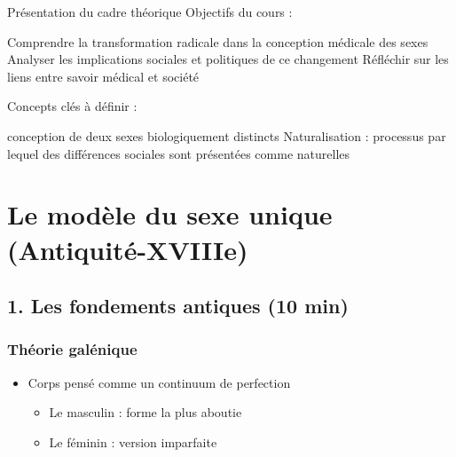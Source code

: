 \documentclass[
  letterpaper,
  DIV=11,
  numbers=noendperiod]{scrreprt}
\providecommand{\tightlist}{%
  \setlength{\itemsep}{0pt}\setlength{\parskip}{0pt}}\usepackage{longtable,booktabs,array}
\begin{document}
Présentation du cadre théorique Objectifs du cours :

Comprendre la transformation radicale dans la conception médicale des
sexes Analyser les implications sociales et politiques de ce changement
Réfléchir sur les liens entre savoir médical et société

Concepts clés à définir :

\begin{description}
\tightlist
\item[Épistémologie : étude de la construction des savoirs Dimorphisme
sexuel]
conception de deux sexes biologiquement distincts Naturalisation :
processus par lequel des différences sociales sont présentées comme
naturelles
\end{description}


\chapter{}\label{section-2}


\chapter{Le modèle du sexe unique
(Antiquité-XVIIIe)}\label{le-moduxe8le-du-sexe-unique-antiquituxe9-xviiie}

\section{1. Les fondements antiques (10
min)}\label{les-fondements-antiques-10-min}

\subsection{Théorie galénique}\label{thuxe9orie-galuxe9nique}

\begin{itemize}
\tightlist
\item
  Corps pensé comme un continuum de perfection

  \begin{itemize}
  \tightlist
  \item
    Le masculin : forme la plus aboutie
  \item
    Le féminin : version imparfaite
  \end{itemize}
\end{itemize}
\end{document}
